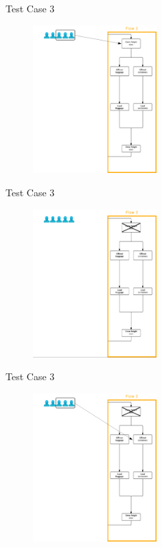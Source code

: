 \begin{frame}{Test Case 3}
\begin{figure}
    \centering
    \includegraphics[width=180px]{Grafik/Flow3/Flow3-0}
\end{figure}
\end{frame}

\begin{frame}{Test Case 3}
\begin{figure}
    \centering
    \includegraphics[width=180px]{Grafik/Flow3/Flow3-1-1}
\end{figure}
\end{frame}

\begin{frame}{Test Case 3}
\begin{figure}
    \centering
    \includegraphics[width=180px]{Grafik/Flow3/Flow3-1}
\end{figure}
\end{frame}

